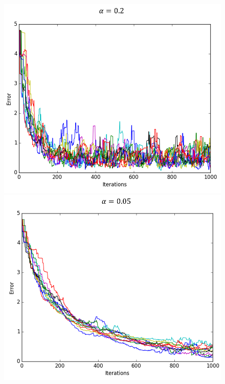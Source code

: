 \documentclass [a4paper] {report}
\begin{document}
	\begin{figure}[H]
		\begin{center}
			\includegraphics[scale=0.35]{Images/QErrors_0_2.png}
		\end{center}
		\begin{center}
			\includegraphics[scale=0.35]{Images/QErrors_0_05.png}
		\end{center}
		\begin{center}

\end{center}
\end{figure}
\end{document}
